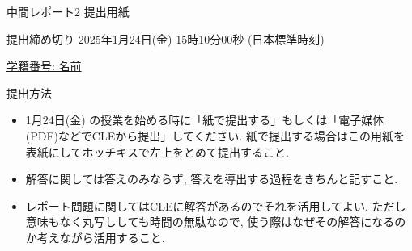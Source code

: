 \documentclass[dvipdfmx,a4paper,11pt]{article}
\theoremstyle{definition}
\begin{document}
\pagestyle{empty}

 
  \begin{center}
 {\Large 中間レポート2 提出用紙 }

{ \large 提出締め切り 2025年1月24日(金) 15時10分00秒 (日本標準時刻)}
\end{center}

\begin{flushleft}
{ \large \underline{学籍番号: \hspace{4cm} 名前  \hspace{9cm}   }  }
\end{flushleft}

\begin{flushleft}
{ \Large 提出方法}
\end{flushleft}
\begin{itemize}
 \setlength{\parskip}{0cm}
  \setlength{\itemsep}{2pt} 
  \item 1月24日(金) の授業を始める時に「紙で提出する」もしくは「電子媒体(PDF)などでCLEから提出」してください. 
  紙で提出する場合はこの用紙を表紙にしてホッチキスで左上をとめて提出すること.
\item 解答に関しては答えのみならず, 答えを導出する過程をきちんと記すこと. 
\item レポート問題に関してはCLEに解答があるのでそれを活用してよい. ただし意味もなく丸写ししても時間の無駄なので, 使う際はなぜその解答になるのか考えながら活用すること. 
\end{itemize}
\end{document}
